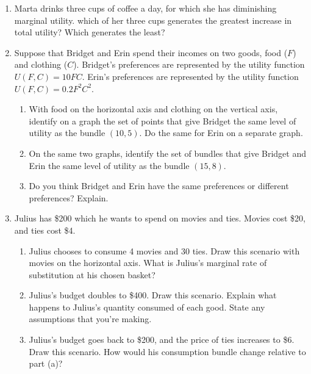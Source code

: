 \documentclass{article}
\begin{document}
\begin{enumerate}
\begin{enumerate}
	\end{enumerate}

\item Marta drinks three cups of coffee a day, for which she has diminishing marginal utility. which of her three cups generates the greatest increase in total utility? Which generates the least?
	
\item Suppose that Bridget and Erin spend their incomes on two goods, food ($F$) and clothing ($C$). Bridget's preferences are represented by the utility function $U(F, C) = 10FC$. Erin's preferences are represented by the utility function $U(F, C) = 0.2F^2C^2$. 

	\begin{enumerate}
	
	\item With food on the horizontal axis and clothing on the vertical axis, identify on a graph the set of points that give Bridget the same level of utility as the bundle $(10, 5)$. Do the same for Erin on a separate graph.
	
	\item On the same two graphs, identify the set of bundles that give Bridget and Erin the same level of utility as the bundle $(15, 8)$.
	
	\item Do you think Bridget and Erin have the same preferences or different preferences? Explain.
	
	\end{enumerate}
	
\item Julius has \$200 which he wants to spend on movies and ties. Movies cost \$20, and ties cost \$4.

	\begin{enumerate}
	
	\item Julius chooses to consume 4 movies and 30 ties. Draw this scenario with movies on the horizontal axis. What is Julius's marginal rate of substitution at his chosen basket?
	
	\item Julius's budget doubles to \$400. Draw this scenario. Explain what happens to Julius's quantity consumed of each good. State any assumptions that you're making.
	
	\item Julius's budget goes back to \$200, and the price of ties increases to \$6. Draw this scenario. How would his consumption bundle change relative to part (a)?
	

\end{enumerate}
\end{enumerate}
\end{document}
